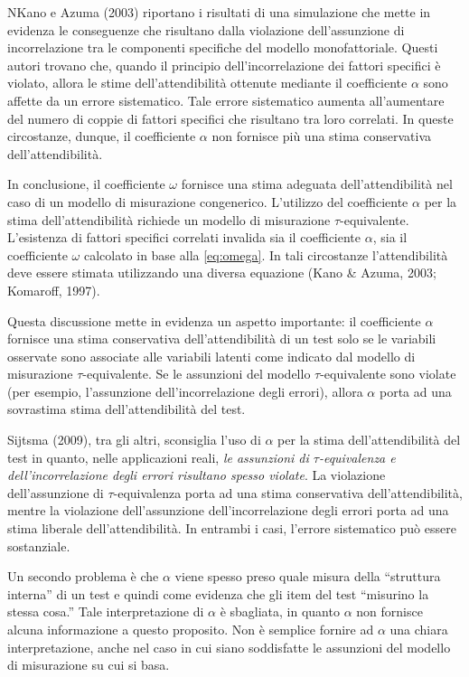 \documentclass[
  11pt,
]{krantz}
\theoremstyle{definition}
\theoremstyle{definition}
\theoremstyle{definition}
\theoremstyle{definition}
\theoremstyle{remark}
\begin{document}
NKano e Azuma (2003) riportano i risultati di una simulazione che mette in evidenza le conseguenze che risultano dalla violazione dell'assunzione di incorrelazione tra le componenti specifiche del modello monofattoriale. Questi autori trovano che, quando il principio dell'incorrelazione dei fattori specifici è violato, allora le stime dell'attendibilità ottenute mediante il coefficiente \(\alpha\) sono affette da un errore sistematico. Tale errore sistematico aumenta all'aumentare del numero di coppie di fattori specifici che risultano tra loro correlati. In queste circostanze, dunque, il coefficiente \(\alpha\) non fornisce più una stima conservativa dell'attendibilità.

In conclusione, il coefficiente \(\omega\) fornisce una stima adeguata dell'attendibilità nel caso di un modello di misurazione congenerico. L'utilizzo del coefficiente \(\alpha\) per la stima dell'attendibilità richiede un modello di misurazione \(\tau\)-equivalente. L'esistenza di fattori specifici correlati invalida sia il coefficiente \(\alpha\), sia il coefficiente \(\omega\) calcolato in base alla \eqref{eq:omega}. In tali circostanze l'attendibilità deve essere stimata utilizzando una diversa equazione (Kano \& Azuma, 2003; Komaroff, 1997).

Questa discussione mette in evidenza un aspetto importante: il coefficiente \(\alpha\) fornisce una stima conservativa dell'attendibilità di un test solo se le variabili osservate sono associate alle variabili latenti come indicato dal modello di misurazione \(\tau\)-equivalente. Se le assunzioni del modello \(\tau\)-equivalente sono violate (per esempio, l'assunzione dell'incorrelazione degli errori), allora \(\alpha\) porta ad una sovrastima stima dell'attendibilità del test.

Sijtsma (2009), tra gli altri, sconsiglia l'uso di \(\alpha\) per la stima dell'attendibilità del test in quanto, nelle applicazioni reali, \emph{le assunzioni di \(\tau\)-equivalenza e dell'incorrelazione degli errori risultano spesso violate}. La violazione dell'assunzione di \(\tau\)-equivalenza porta ad una stima conservativa dell'attendibilità, mentre la violazione dell'assunzione dell'incorrelazione degli errori porta ad una stima liberale dell'attendibilità. In entrambi i casi, l'errore sistematico può essere sostanziale.

Un secondo problema è che \(\alpha\) viene spesso preso quale misura della ``struttura interna'' di un test e quindi come evidenza che gli item del test ``misurino la stessa cosa.'' Tale interpretazione di \(\alpha\) è sbagliata, in quanto \(\alpha\) non fornisce alcuna informazione a questo proposito. Non è semplice fornire ad \(\alpha\) una chiara interpretazione, anche nel caso in cui siano soddisfatte le assunzioni del modello di misurazione su cui si basa.
\end{document}

